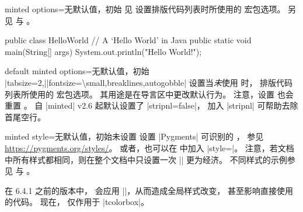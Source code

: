 \begin{docTcbKey}[][doc updated={2021-12-15}]{minted options}{=}{无默认值，初始
    \linebreak 见 }
  设置排版代码列表时所使用的  \cite{poore:minted} 宏包选项。
  另见  与 。
\begin{dispExample}

\begin{myjava}
  public class HelloWorld {
    // A `Hello World' in Java
    public static void main(String[] args) {
      System.out.println("Hello World!");
    }
  }
\end{myjava}
\end{dispExample}
\end{docTcbKey}


\clearpage
\begin{docTcbKey}[][doc new={2021-12-15}]{default minted options}{=}{无默认值，初始
    |tabsize=2,|\linebreak|fontsize=\textbackslash small,breaklines,autogobble|}
  设置当\emph{未}使用  时，
  排版代码列表所使用的  \cite{poore:minted} 宏包选项。
  其用途是在导言区中更改默认行为。
  注意，设置  也会重置 。
  自 |minted| \cite{poore:minted} v2.6 起默认设置了 |stripnl=false|，
  加入 |stripnl| 可帮助去除首尾空行。
\begin{dispListing}
\end{dispListing}
\end{docTcbKey}



\begin{docTcbKey}[][doc updated=2024-11-07]{minted style}{=}{无默认值，初始未设置}
设置 |Pygments| \cite{pygments:web} 可识别的 ，
参见 \url{https://pygments.org/styles/}。
或者，也可以在  中加入 |style=|。
注意，若文档中所有样式都相同，则在整个文档中只设置一次
|\usemintedstyle| 更为经济。
不同样式的示例参见  与 。

\begin{marker}
在 6.4.1 之前的版本中， 会应用
|\usemintedstyle|，从而造成全局样式改变，
甚至影响直接使用  的代码。
现在， 仅作用于 |tcolorbox|。
\end{marker}

\end{docTcbKey}

